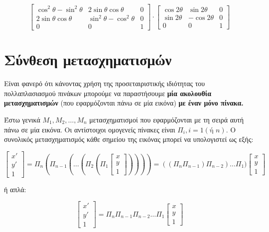 \[
\begin{bmatrix}
\cos^2\theta - \sin^2\theta & 2\sin\theta\cos\theta & 0 \\
2\sin\theta\cos\theta & \sin^2\theta - \cos^2\theta & 0 \\
0 & 0 & 1
\end{bmatrix}
\cdot
\begin{bmatrix}
\cos 2\theta & \sin 2\theta & 0 \\
\sin 2\theta & -\cos 2\theta & 0 \\
0 & 0 & 1
\end{bmatrix}
\]

\section{Σύνθεση μετασχηματισμών}

Είναι φανερό ότι κάνοντας χρήση της προσεταιριστικής ιδιότητας του πολλαπλασιασμού πινάκων μπορούμε να παραστήσουμε \textbf{μία ακολουθία μετασχηματισμών} (που εφαρμόζονται πάνω σε μία εικόνα) \textbf{με έναν μόνο πίνακα.}

Έστω γενικά $M_1, M_2, \ldots, M_n$ μετασχηματισμοί που εφαρμόζονται με τη σειρά αυτή πάνω σε μία εικόνα. Οι αντίστοιχοι ομογενείς πίνακες είναι $\Pi_i, i=1(\text{ή } n)$. Ο συνολικός μετασχηματισμός κάθε σημείου της εικόνας μπορεί να υπολογιστεί ως εξής:

\[
\begin{bmatrix}
x' \\ y' \\ 1
\end{bmatrix}
=
\Pi_n (\Pi_{n-1} (\ldots (\Pi_2 (\Pi_1
\begin{bmatrix}
x \\ y \\ 1
\end{bmatrix}))))
=
((\Pi_n \Pi_{n-1}) \Pi_{n-2}) \ldots \Pi_1)
\begin{bmatrix}
x \\ y \\ 1
\end{bmatrix}
\]

ή απλά:

\[
\begin{bmatrix}
x' \\ y' \\ 1
\end{bmatrix}
=
\Pi_n \Pi_{n-1} \Pi_{n-2} \ldots \Pi_1
\begin{bmatrix}
x \\ y \\ 1
\end{bmatrix}
\]

